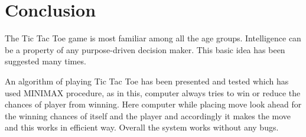 \chapter{Conclusion}

The Tic Tac Toe game is most familiar among all the age groups. Intelligence can be a property of any purpose-driven decision maker. This basic idea has been suggested many times. 

\noindent
An algorithm of playing Tic Tac Toe has been presented and tested which has used MINIMAX procedure, as in this, computer always tries to win or reduce the chances of player from winning. Here computer while placing move look ahead for the winning chances of itself and the player and accordingly it makes the move  and this works in efficient way. Overall the system works without any bugs.